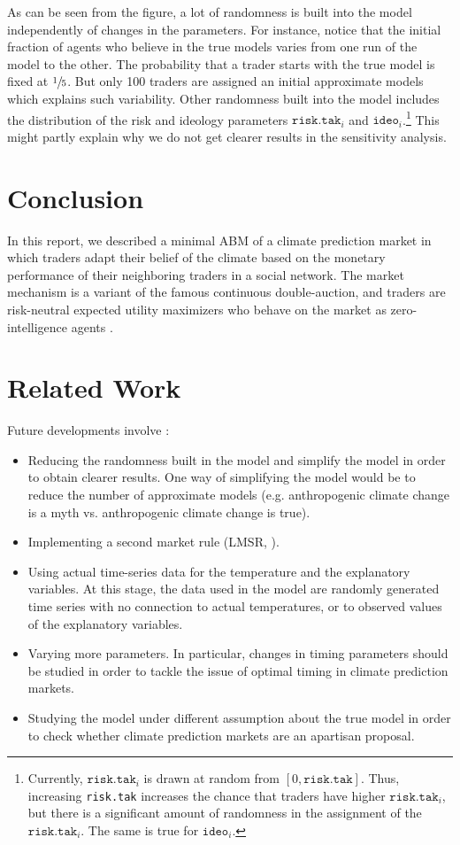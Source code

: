 \documentclass{sig-alternate}
\begin{document}
	As can be seen from the figure, a lot of randomness is built into the model independently of changes in the parameters. For instance, notice that the initial fraction of agents who believe in the true models varies from one run of the model to the other.  The probability that a trader starts with the true model is fixed at $\sfrac{1}{5}$. But only 100 traders are assigned an initial approximate models which explains such variability. Other randomness built into the model includes the distribution of the risk and ideology parameters $\texttt{risk.tak}_i$ and $\texttt{ideo}_i$.\footnote{Currently, $\texttt{risk.tak}_i$ is drawn at random from $[0, \texttt{risk.tak}]$. Thus, increasing \texttt{risk.tak} increases the chance that traders have higher $\texttt{risk.tak}_i$, but there is a significant amount of randomness in the assignment of the $\texttt{risk.tak}_i$. The same is true for $\texttt{ideo}_i$.} This might partly explain why we do not get clearer results in the sensitivity analysis.
	
	\section{Conclusion}
	
	In this report, we described a minimal ABM of a climate prediction market in which traders adapt their belief of the climate based on the monetary performance of their neighboring traders in a social network. The market mechanism is a variant of the famous continuous double-auction, and traders are risk-neutral expected utility maximizers who behave on the market as zero-intelligence agents \citep{Gode1993}.
		\section{Related Work}
	Future developments involve :
	
	\begin{itemize}
		\item Reducing the randomness built in the model and simplify the model in order to obtain clearer results. One way of simplifying the model would be to reduce the number of approximate models (e.g. anthropogenic climate change is a myth vs. anthropogenic climate change is true).
		\item Implementing a second market rule (LMSR, \cite{Hanson2012}).
		\item Using actual time-series data for the temperature and the explanatory variables. At this stage, the data used in the model are randomly generated time series with no connection to actual temperatures, or to observed values of the explanatory variables.
		\item Varying more parameters. In particular, changes in timing parameters should be studied in order to tackle the issue of optimal timing in climate prediction markets.
		\item Studying the model under different assumption about the true model in order to check whether climate prediction markets are an apartisan proposal.
	\end{itemize}
	
\end{document}
